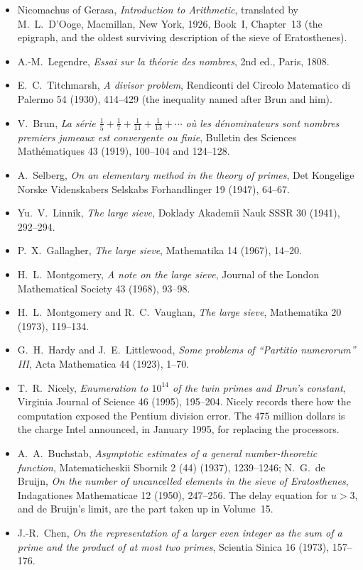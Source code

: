 \begin{itemize}
\item Nicomachus of Gerasa, \emph{Introduction to Arithmetic}, translated by M.~L.~D'Ooge, Macmillan, New York, 1926, Book~I, Chapter~13 (the epigraph, and the oldest surviving description of the sieve of Eratosthenes).
\item A.-M.~Legendre, \emph{Essai sur la th\'eorie des nombres}, 2nd ed., Paris, 1808.
\item E.~C.~Titchmarsh, \emph{A divisor problem}, Rendiconti del Circolo Matematico di Palermo 54 (1930), 414--429 (the inequality named after Brun and him).
\item V.~Brun, \emph{La s\'erie $\frac15+\frac17+\frac1{11}+\frac1{13}+\cdots$ o\`u les d\'enominateurs sont nombres premiers jumeaux est convergente ou finie}, Bulletin des Sciences Math\'ematiques 43 (1919), 100--104 and 124--128.
\item A.~Selberg, \emph{On an elementary method in the theory of primes}, Det Kongelige Norske Videnskabers Selskabs Forhandlinger 19 (1947), 64--67.
\item Yu.~V.~Linnik, \emph{The large sieve}, Doklady Akademii Nauk SSSR 30 (1941), 292--294.
\item P.~X.~Gallagher, \emph{The large sieve}, Mathematika 14 (1967), 14--20.
\item H.~L.~Montgomery, \emph{A note on the large sieve}, Journal of the London Mathematical Society 43 (1968), 93--98.
\item H.~L.~Montgomery and R.~C.~Vaughan, \emph{The large sieve}, Mathematika 20 (1973), 119--134.
\item G.~H.~Hardy and J.~E.~Littlewood, \emph{Some problems of ``Partitio numerorum'' III}, Acta Mathematica 44 (1923), 1--70.
\item T.~R.~Nicely, \emph{Enumeration to $10^{14}$ of the twin primes and Brun's constant}, Virginia Journal of Science 46 (1995), 195--204. Nicely records there how the computation exposed the Pentium division error. The $475$ million dollars is the charge Intel announced, in January 1995, for replacing the processors.
\item A.~A.~Buchstab, \emph{Asymptotic estimates of a general number-theoretic function}, Matematicheskii Sbornik 2 (44) (1937), 1239--1246; N.~G.~de Bruijn, \emph{On the number of uncancelled elements in the sieve of Eratosthenes}, Indagationes Mathematicae 12 (1950), 247--256. The delay equation for $u>3$, and de Bruijn's limit, are the part taken up in Volume~15.
\item J.-R.~Chen, \emph{On the representation of a larger even integer as the sum of a prime and the product of at most two primes}, Scientia Sinica 16 (1973), 157--176.

\end{itemize}
